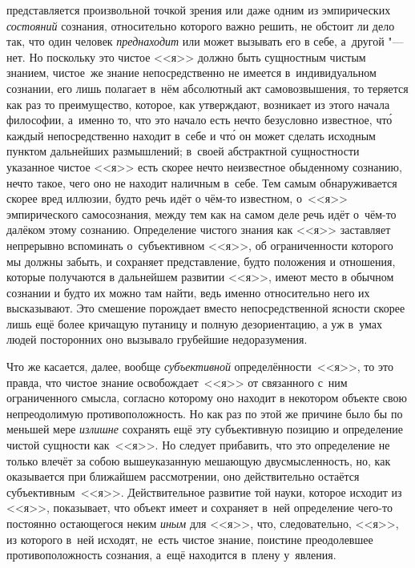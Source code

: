 представляется произвольной точкой зрения или даже одним из эмпирических
{\em состояний} сознания, относительно которого важно решить, не обстоит ли
дело так, что один человек {\em преднаходит} или может вызывать его в себе,
а~другой "--- нет. Но поскольку это чистое <<я>> должно быть сущностным
чистым знанием, чистое~же знание непосредственно не имеется в~индивидуальном сознании,
его лишь полагает в~нём абсолютный акт самовозвышения, то
теряется как раз то преимущество, которое, как утверждают, возникает из этого
начала философии, а~именно то, что это начало есть нечто безусловно известное,
чт\'{о} каждый непосредственно находит в~себе и чт\'{о} он может сделать
исходным пунктом дальнейших размышлений; в~своей
абстрактной сущностности указанное чистое <<я>> есть скорее нечто неизвестное обыденному сознанию, нечто такое,
чего оно не находит наличным в~себе. Тем самым обнаруживается скорее вред иллюзии,
будто речь идёт о чём-то известном, о~<<я>> эмпирического
самосознания, между тем как на самом деле речь идёт о~чём-то далёком этому
сознанию. Определение чистого знания как <<я>> заставляет непрерывно вспоминать
о~субъективном <<я>>, об ограниченности которого мы должны забыть, и сохраняет
представление, будто положения и отношения, которые получаются в дальнейшем
развитии <<я>>, имеют место в обычном сознании и будто их можно там найти,
ведь именно относительно него их высказывают. Это смешение
порождает вместо непосредственной ясности скорее лишь ещё более кричащую
путаницу и полную дезориентацию, а уж в~умах людей посторонних оно вызывало
грубейшие недоразумения.

Что же касается, далее, вообще {\em субъективной} определённости~<<я>>, то это
правда, что чистое знание освобождает~<<я>> от связанного с~ним ограниченного
смысла, согласно которому оно находит в некотором объекте свою непреодолимую
противоположность. Но как раз по этой же причине было бы по меньшей мере
{\em излишне} сохранять ещё эту субъективную позицию и определение чистой
сущности как~<<я>>. Но следует прибавить, что это определение не только влечёт
за собою вышеуказанную мешающую двусмысленность, но, как оказывается при
ближайшем рассмотрении, оно действительно остаётся субъективным~<<я>>.
Действительное развитие той науки, которое исходит из <<я>>, показывает, что
объект имеет и сохраняет в~ней определение чего-то постоянно остающегося неким
{\em иным} для <<я>>, что, следовательно, <<я>>, из которого в~ней исходят,
не~есть чистое знание, поистине преодолевшее противоположность сознания, а~ещё
находится в~плену у~явления.

